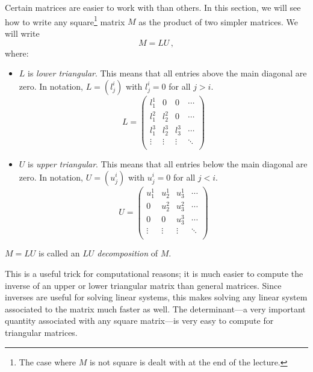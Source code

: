\chapter{\luDecompTitle}
\label{LUdecomp}

Certain matrices are easier to work with than others.  In this section, we will see how to write any square\footnote{The case where $M$ is not square is dealt with at the end of the lecture.} matrix $M$ as the product of two simpler matrices.  We will write $$M=LU\, ,$$ where:
\begin{itemize}
\item $L$ is \emph{lower triangular}.  This means that all entries above the main diagonal are zero.  In notation,
$L=(l^i_j)$ with $l^i_j=0$ for all $j>i$.
\[L=\begin{pmatrix}
l^1_1 & 0 & 0 & \cdots \\
l^2_1 & l^2_2 & 0 & \cdots \\
l^3_1 & l^3_2 & l^3_3 & \cdots \\
\vdots & \vdots & \vdots & \ddots \\
\end{pmatrix}
\]

\item $U$ is \emph{upper triangular}.  This means that all entries below the main diagonal are zero.  In notation,
$U=(u^i_j)$ with $u^i_j=0$ for all $j<i$.
\[U=\begin{pmatrix}
u^1_1 & u^1_2 & u^1_3 & \cdots \\
0 & u^2_2 & u^2_3 & \cdots \\
0 & 0 & u^3_3 & \cdots \\
\vdots & \vdots & \vdots & \ddots \\
\end{pmatrix}
\]
\end{itemize}
$M=LU$ is called an \emph{$LU$ decomposition} of $M$.

This is a useful trick for  computational reasons; it is much easier to compute the inverse of an upper or lower triangular matrix than general matrices.  Since inverses are useful for solving linear systems, this makes solving any linear system associated to the matrix much faster as well.  The determinant---a very important quantity associated with any square matrix---is very easy to compute for triangular matrices.

